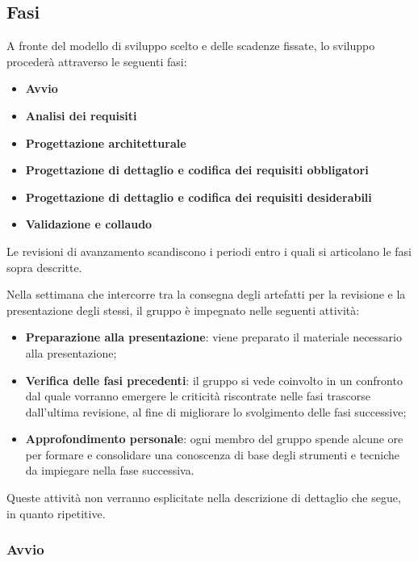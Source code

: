 \subsection{Fasi}

A fronte del modello di sviluppo scelto e delle scadenze fissate, lo sviluppo procederà attraverso le seguenti fasi:
\begin{itemize}
	\item \textbf{Avvio}
	\item \textbf{Analisi dei requisiti}
	\item \textbf{Progettazione architetturale}
	\item \textbf{Progettazione di dettaglio e codifica dei requisiti obbligatori}
	\item \textbf{Progettazione di dettaglio e codifica dei requisiti desiderabili}
	\item \textbf{Validazione e collaudo}
\end{itemize}

Le revisioni di avanzamento scandiscono i periodi entro i quali si articolano le fasi sopra descritte.

Nella settimana che intercorre tra la consegna degli artefatti per la revisione e la presentazione degli stessi, il gruppo è impegnato nelle seguenti attività: 
\begin{itemize}
	\item \textbf{Preparazione alla presentazione}: viene preparato il materiale necessario alla presentazione;
	\item \textbf{Verifica delle fasi precedenti}: il gruppo si vede coinvolto in un confronto dal quale vorranno emergere le criticità riscontrate nelle fasi trascorse dall'ultima revisione, al fine di migliorare lo svolgimento delle fasi successive;
	\item \textbf{Approfondimento personale}: ogni membro del gruppo spende alcune ore per formare e consolidare una conoscenza di base degli strumenti e tecniche da impiegare nella fase successiva.
\end{itemize}
Queste attività non verranno esplicitate nella descrizione di dettaglio che segue, in quanto ripetitive.



\subsubsection{Avvio}

